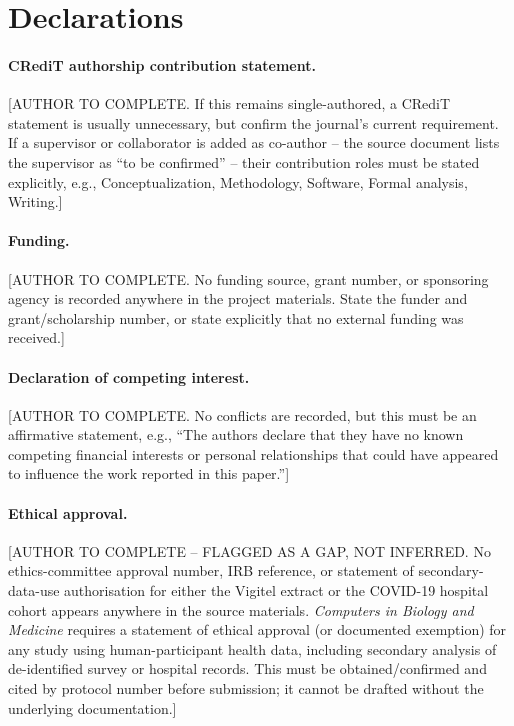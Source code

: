 \section*{Declarations}
\label{sec:declarations}


\paragraph{CRediT authorship contribution statement.}
[AUTHOR TO COMPLETE. If this remains single-authored, a CRediT statement is usually unnecessary, but confirm the journal's current requirement. If a supervisor or collaborator is added as co-author -- the source document lists the supervisor as ``to be confirmed'' -- their contribution roles must be stated explicitly, e.g., Conceptualization, Methodology, Software, Formal analysis, Writing.]

\paragraph{Funding.}
[AUTHOR TO COMPLETE. No funding source, grant number, or sponsoring agency is recorded anywhere in the project materials. State the funder and grant/scholarship number, or state explicitly that no external funding was received.]

\paragraph{Declaration of competing interest.}
[AUTHOR TO COMPLETE. No conflicts are recorded, but this must be an affirmative statement, e.g., ``The authors declare that they have no known competing financial interests or personal relationships that could have appeared to influence the work reported in this paper.'']

\paragraph{Ethical approval.}
[AUTHOR TO COMPLETE -- FLAGGED AS A GAP, NOT INFERRED. No ethics-committee approval number, IRB reference, or statement of secondary-data-use authorisation for either the Vigitel extract or the COVID-19 hospital cohort appears anywhere in the source materials. \emph{Computers in Biology and Medicine} requires a statement of ethical approval (or documented exemption) for any study using human-participant health data, including secondary analysis of de-identified survey or hospital records. This must be obtained/confirmed and cited by protocol number before submission; it cannot be drafted without the underlying documentation.]

